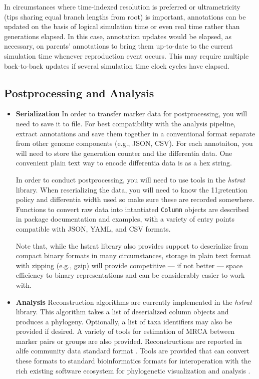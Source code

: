 In circumstances where time-indexed resolution is preferred or ultrametricity (tips sharing equal branch lengths from root) is important, annotations can be updated on the basis of logical simulation time or even real time rather than generations elapsed.
In this case, annotation updates would be elapsed, as necessary, on parents' annotations to bring them up-to-date to the current simulation time whenever reproduction event occurs.
This may require multiple back-to-back updates if several simulation time clock cycles have elapsed.

\subsection{Postprocessing and Analysis}
\begin{itemize}
\item \textbf{Serialization}
In order to transfer marker data for postprocessing, you will need to save it to file.
For best compatibility with the analysis pipeline, extract annotations and save them together in a conventional format separate from other genome components (e.g., JSON, CSV).
For each annotaiton, you will need to store the generation counter and the differentia data.
One convenient plain text way to encode differentia data is as a hex string.

In order to conduct postprocessing, you will need to use tools in the \textit{hstrat} library.
When reserializing the data, you will need to know the 11¡retention policy and differentia width used so make sure these are recorded somewhere.
Functions to convert raw data into intantiated \texttt{Column} objects are described in package documentation and examples, with a variety of entry points compatible with JSON, YAML, and CSV formats.

Note that, while the hstrat library also provides support to deserialize from compact binary formats in many circumstances, storage in plain text format with zipping (e.g., gzip) will provide competitive --- if not better --- space efficiency to binary representations and can be considerably easier to work with.

\item \textbf{Analysis}
Reconstruction algorithms are currently implemented in the \textit{hstrat} library.
This algorithm takes a list of deserialized column objects and produces a phylogeny.
Optionally, a list of taxa identifiers may also be provided if desired.
A variety of tools for estimation of MRCA between marker pairs or groups are also provided.
Reconstructions are reported in alife community data standard format \citep{TODO}.
Tools are provided that can convert these formats to standard bioinformatics formats for interoperation with the rich existing software ecosystem for phylogenetic visualization and analysis \citep{TODOalifedataphyloinformaticsconvert}.
\end{itemize}

